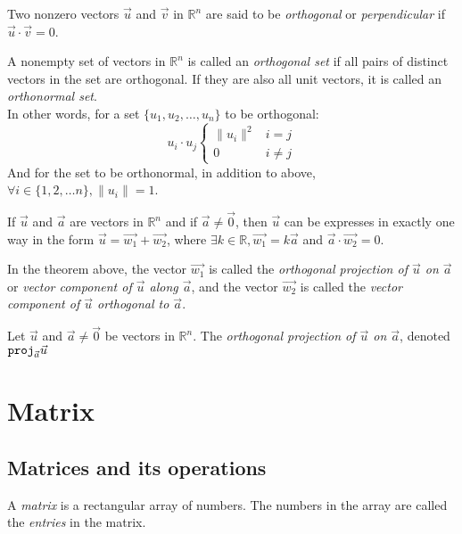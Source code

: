 \documentclass{report}
\begin{document}
		\begin{defn}
			Two nonzero vectors $\vec{u}$ and $\vec{v}$ in $\mathbb{R}^n$ are said to be \emph{orthogonal} or \emph{perpendicular} if $\vec{u} \cdot \vec{v} = 0$.
		\end{defn}
		
		\begin{defn}
			A nonempty set of vectors in $\mathbb{R}^n$ is called an \emph{orthogonal set} if all pairs of distinct vectors in the set are orthogonal. If they are also all unit vectors, it is called an \emph{orthonormal set}.\\
			In other words, for a set $\{u_1, u_2, \dots, u_n\}$ to be orthogonal:
			\begin{displaymath}
				u_i \cdot u_j
				\begin{cases}
					\|u_i\|^2 & i=j\\
					0 & i \ne j
				\end{cases}
			\end{displaymath}
			And for the set to be orthonormal, in addition to above, $\forall i \in \{1, 2, \dots n\}, \|u_i\|=1$.
		\end{defn}
		
		\begin{thm}
			If $\vec{u}$ and $\vec{a}$ are vectors in $\mathbb{R}^n$ and if $\vec{a} \ne \vec{0}$, then $\vec{u}$ can be expresses in exactly one way in the form $\vec{u}=\vec{w_1}+\vec{w_2}$, where $\exists k \in \mathbb{R}, \vec{w_1}=k\vec{a}$ and $\vec{a} \cdot \vec{w_2}=0$.
		\end{thm}
		
		In the theorem above, the vector $\vec{w_1}$ is called the \emph{orthogonal projection of $\vec{u}$ on $\vec{a}$} or \emph{vector component of $\vec{u}$ along $\vec{a}$}, and the vector $\vec{w_2}$ is called the \emph{vector component of $\vec{u}$ orthogonal to $\vec{a}$}.
		
		\begin{defn}[Projection]
			Let $\vec{u}$ and $\vec{a} \ne \vec{0}$ be vectors in $\mathbb{R}^n$. The \emph{orthogonal projection of $\vec{u}$ on $\vec{a}$}, denoted $\verb|proj|_{\vec{a}}\vec{u}$
		\end{defn}
	
	\section{Matrix}
		\subsection{Matrices and its operations}
			\begin{defn}[Matrix]
				A \emph{matrix} is a rectangular array of numbers. The numbers in the array are called the \emph{entries} in the matrix.
			\end{defn}
		
\end{document}
